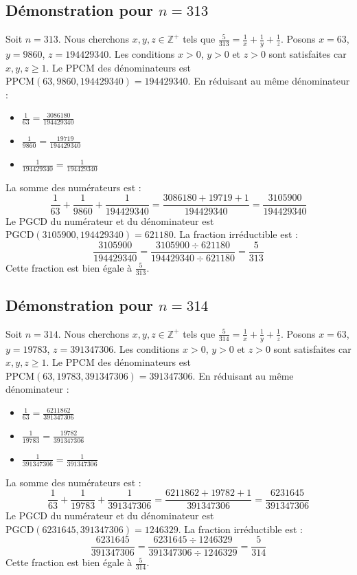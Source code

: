 \documentclass[11pt,a4paper]{article}
\begin{document}
\subsection{Démonstration pour $n = 313$}
Soit $n = 313$. Nous cherchons $x, y, z \in \mathbb{Z}^{+}$ tels que $\frac{5}{313} = \frac{1}{x} + \frac{1}{y} + \frac{1}{z}$.
Posons $x = 63$, $y = 9860$, $z = 194429340$.
Les conditions $x > 0$, $y > 0$ et $z > 0$ sont satisfaites car $x, y, z \geq 1$.
Le PPCM des dénominateurs est $\text{PPCM}(63, 9860, 194429340) = 194429340$.
En réduisant au même dénominateur :
\begin{itemize}
    \item $\frac{1}{63} = \frac{3086180}{194429340}$
    \item $\frac{1}{9860} = \frac{19719}{194429340}$
    \item $\frac{1}{194429340} = \frac{1}{194429340}$
\end{itemize}
La somme des numérateurs est :
$$ \frac{1}{63} + \frac{1}{9860} + \frac{1}{194429340} = \frac{3086180 + 19719 + 1}{194429340} = \frac{3105900}{194429340} $$
Le PGCD du numérateur et du dénominateur est $\text{PGCD}(3105900, 194429340) = 621180$.
La fraction irréductible est :
$$ \frac{3105900}{194429340} = \frac{3105900 \div 621180}{194429340 \div 621180} = \frac{5}{313} $$
Cette fraction est bien égale à $\frac{5}{313}$.

\subsection{Démonstration pour $n = 314$}
Soit $n = 314$. Nous cherchons $x, y, z \in \mathbb{Z}^{+}$ tels que $\frac{5}{314} = \frac{1}{x} + \frac{1}{y} + \frac{1}{z}$.
Posons $x = 63$, $y = 19783$, $z = 391347306$.
Les conditions $x > 0$, $y > 0$ et $z > 0$ sont satisfaites car $x, y, z \geq 1$.
Le PPCM des dénominateurs est $\text{PPCM}(63, 19783, 391347306) = 391347306$.
En réduisant au même dénominateur :
\begin{itemize}
    \item $\frac{1}{63} = \frac{6211862}{391347306}$
    \item $\frac{1}{19783} = \frac{19782}{391347306}$
    \item $\frac{1}{391347306} = \frac{1}{391347306}$
\end{itemize}
La somme des numérateurs est :
$$ \frac{1}{63} + \frac{1}{19783} + \frac{1}{391347306} = \frac{6211862 + 19782 + 1}{391347306} = \frac{6231645}{391347306} $$
Le PGCD du numérateur et du dénominateur est $\text{PGCD}(6231645, 391347306) = 1246329$.
La fraction irréductible est :
$$ \frac{6231645}{391347306} = \frac{6231645 \div 1246329}{391347306 \div 1246329} = \frac{5}{314} $$
Cette fraction est bien égale à $\frac{5}{314}$.
\end{document}
